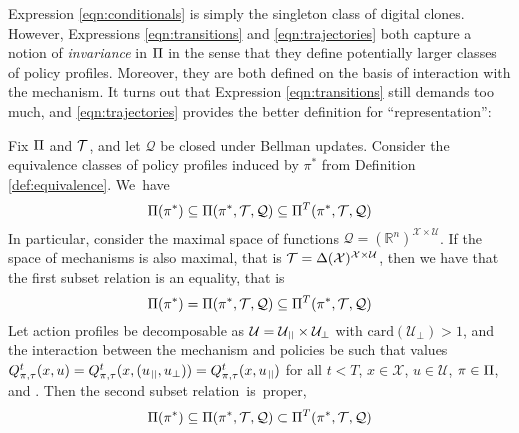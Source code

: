 Expression \ref{eqn:conditionals} is simply the singleton class of digital clones. However, Expressions \ref{eqn:transitions} and \ref{eqn:trajectories} both capture a notion of \textit{invariance} in $\Pi$ in the sense that they define potentially larger classes of policy profiles. Moreover, they are both defined on the basis of interaction with the mechanism. It turns out that Expression \ref{eqn:transitions} still demands too much, and \ref{eqn:trajectories} provides the better definition for ``representation'':

\begin{reproposition}[restate=thmequivalence,name=Representational Equivalence]\upshape\label{thm:equivalence}
Fix $\Pi$ and $\mathcal{T}$, and let $\mathcal{Q}$ be closed under Bellman updates. Consider the equivalence classes of policy profiles induced by $\pi^{*}$ from Definition \ref{def:equivalence}. We~have
%
\begin{equation}
\Pi(\pi^{*})
\subseteq
\Pi(\pi^{*},\mathcal{T},\mathcal{Q})
\subseteq
\Pi^{T}(\pi^{*},\mathcal{T},\mathcal{Q})
\label{eqn:subseteq}
\end{equation}
%
In particular, consider the maximal space of functions
$\mathcal{Q}=(\mathbb{R}^{n})^{\mathcal{X}\times\mathcal{U}}$.
If the space of mechanisms is also maximal,
that is $\mathcal{T}=\Delta(\mathcal{X})^{\mathcal{X}\times\mathcal{U}}$, then we have that the first subset relation is an equality, that is
%
\begin{equation}
\Pi(\pi^{*})
=
\Pi(\pi^{*},\mathcal{T},\mathcal{Q})
\subseteq
\Pi^{T}(\pi^{*},\mathcal{T},\mathcal{Q})
\label{eqn:equality}
\end{equation}
%
Let action profiles be decomposable as $\mathcal{U}=\mathcal{U}_{\para}\times\mathcal{U}_{\bot}$ with $\text{card}(\mathcal{U}_{\bot})$\pix$>$\pix$1$,
and the interaction between the mechanism and policies be such that values $Q_{\pi,\tau}^{t}(x,u)=Q_{\pi,\tau}^{t}(x,(u_{\para},u_{\bot}))=Q_{\pi,\tau}^{t}(x,u_{\para})$ for all $t<T$, $x\in\mathcal{X}$, $u\in\mathcal{U}$, $\pi\in\Pi$, and . Then the second subset relation~is~proper,
%
\begin{equation}
\Pi(\pi^{*})
\subseteq
\Pi(\pi^{*},\mathcal{T},\mathcal{Q})
\subset
\Pi^{T}(\pi^{*},\mathcal{T},\mathcal{Q})
\label{eqn:subset}
\end{equation}
%
\end{reproposition}

